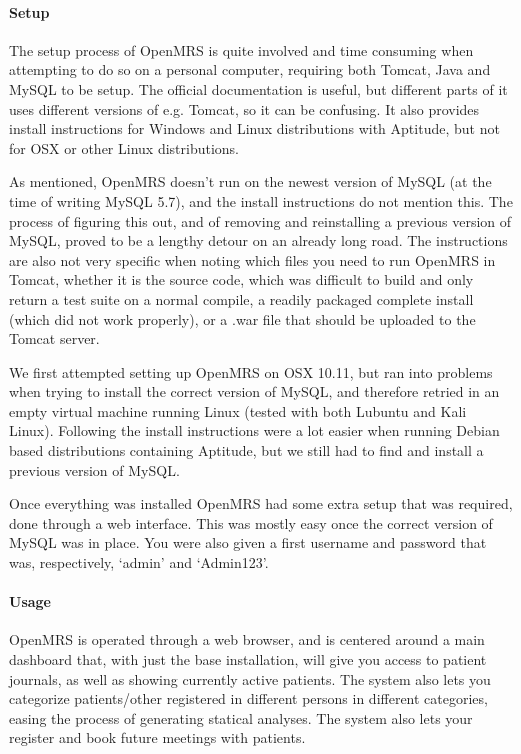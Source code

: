 \documentclass{report} %
\begin{document}
  \paragraph{Setup}

  The setup process of OpenMRS is quite involved and time consuming when
  attempting to do so on a personal computer, requiring both Tomcat, Java and
  MySQL to be setup. The official documentation is useful, but different parts
  of it uses different versions of e.g. Tomcat, so it can be confusing.
  It also provides install instructions for Windows and Linux distributions
  with Aptitude, but not for OSX or other Linux distributions. 

  As mentioned, OpenMRS doesn't run on the newest version of MySQL (at the time
  of writing MySQL 5.7), and the install instructions do not mention this. The
  process of figuring this out, and of removing and reinstalling a previous
  version of MySQL, proved to be a lengthy detour on an already long road.
  The instructions are also not very specific when noting which files you need
  to run OpenMRS in Tomcat, whether it is the source code, which was difficult
  to build and only return a test suite on a normal compile, a readily packaged
  complete install (which did not work properly), or a .war file that should be
  uploaded to the Tomcat server.

  We first attempted setting up OpenMRS on OSX 10.11, but ran into problems when
  trying to install the correct version of MySQL, and therefore retried in an
  empty virtual machine running Linux (tested with both Lubuntu and Kali Linux).
  Following the install instructions were a lot easier when running Debian based
  distributions containing Aptitude, but we still had to find and install a
  previous version of MySQL. 

  Once everything was installed OpenMRS had some extra setup that was required,
  done through a web interface. This was mostly easy once the correct version of
  MySQL was in place. You were also given a first username and password that
  was, respectively, `admin' and `Admin123'.

  \paragraph{Usage}

  OpenMRS is operated through a web browser, and is centered around a main dashboard that,
  with just the base installation, will give you access to patient journals, as well as
  showing currently active patients. The system also lets you categorize patients/other registered
  in different persons in different categories, easing the process of generating statical analyses.
  The system also lets your register and book future meetings with patients.
\end{document}
